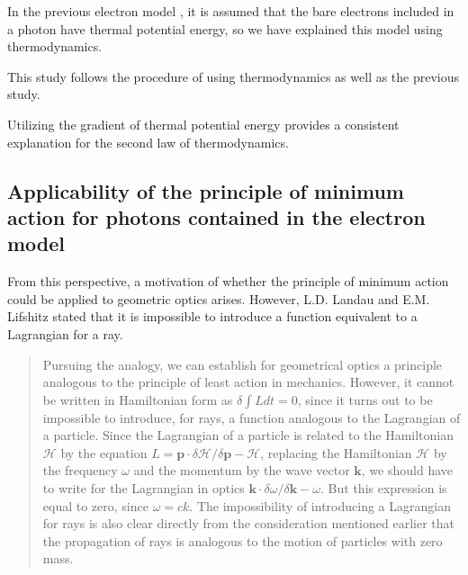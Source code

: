 \documentclass[reprint,amsmath,amssymb,aps,]{revtex4-1}
\numberwithin{equation}{section}%
\begin{document}
    In the previous electron model \cite{Hanamura1}, it is assumed that the bare electrons included in a photon have thermal potential energy, so we have explained this model using thermodynamics.

    This study follows the procedure of using thermodynamics as well as the previous study.
    
    Utilizing the gradient of thermal potential energy provides a consistent explanation for the second law of thermodynamics.


\subsection{
    \label{sec:}Applicability of the principle of minimum action for photons contained in the electron model}
    

    From this perspective, a motivation of whether the principle of minimum action could be applied to geometric optics arises. However, L.D. Landau and E.M. Lifshitz stated that it is impossible to introduce a function equivalent to a Lagrangian for a ray.
    
    
    \begin{quote}
        Pursuing the analogy, we can establish for geometrical optics a principle analogous to the principle of least action in mechanics. However, it cannot be written in Hamiltonian form as $\delta \int L dt = 0$, since it turns out to be impossible to introduce, for rays, a function analogous to the Lagrangian of a particle. Since the Lagrangian of a particle is related to the Hamiltonian $\mathcal{H}$ by the equation $L = \bm{p} \cdot \delta \mathcal{H} / \delta \bm{p} - \mathcal{H}$, replacing the Hamiltonian $\mathcal{H}$ by the frequency $\omega$ and the momentum by the wave vector $\bm{k}$, we should have to write for the Lagrangian in optics $\bm{k} \cdot \delta \omega / \delta \bm{k}- \omega$. But this expression is equal to zero, since $\omega = c k$. The impossibility of introducing a Lagrangian for rays is also clear directly from the consideration mentioned earlier that the propagation of rays is analogous to the motion of particles with zero mass. \cite{Landau}
    \end{quote}
\end{document}
